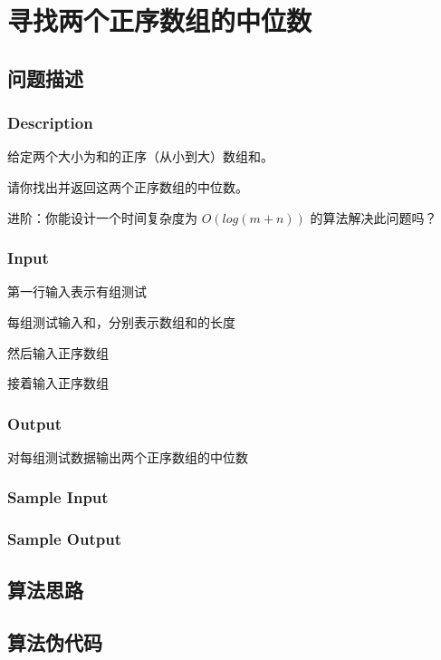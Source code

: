 
\section{寻找两个正序数组的中位数}
\subsection{问题描述}
\subsubsection*{Description}
给定两个大小为和的正序（从小到大）数组和。

请你找出并返回这两个正序数组的中位数。

进阶：你能设计一个时间复杂度为 $O(log (m+n))$ 的算法解决此问题吗？

\subsubsection*{Input}

第一行输入表示有组测试

每组测试输入和，分别表示数组和的长度

然后输入正序数组

接着输入正序数组

\subsubsection*{Output}

对每组测试数据输出两个正序数组的中位数

\subsubsection*{Sample Input}








\subsubsection*{Sample Output}



\subsection{算法思路}

\subsection{算法伪代码}
